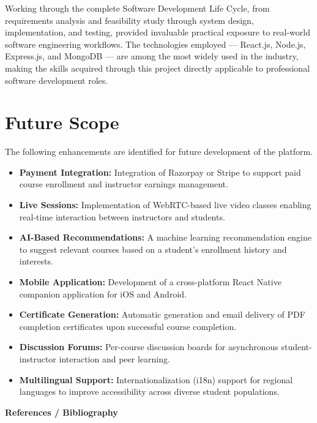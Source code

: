 \documentclass[12pt, a4paper, oneside]{report}
\begin{document}
Working through the complete Software Development Life Cycle, from requirements analysis and feasibility study through system design, implementation, and testing, provided invaluable practical exposure to real-world software engineering workflows. The technologies employed --- React.js, Node.js, Express.js, and MongoDB --- are among the most widely used in the industry, making the skills acquired through this project directly applicable to professional software development roles.

\section*{Future Scope}

The following enhancements are identified for future development of the platform.

\begin{itemize}[leftmargin=1.5cm, itemsep=2pt]
  \item \textbf{Payment Integration:} Integration of Razorpay or Stripe to support paid course enrollment and instructor earnings management.
  \item \textbf{Live Sessions:} Implementation of WebRTC-based live video classes enabling real-time interaction between instructors and students.
  \item \textbf{AI-Based Recommendations:} A machine learning recommendation engine to suggest relevant courses based on a student's enrollment history and interests.
  \item \textbf{Mobile Application:} Development of a cross-platform React Native companion application for iOS and Android.
  \item \textbf{Certificate Generation:} Automatic generation and email delivery of PDF completion certificates upon successful course completion.
  \item \textbf{Discussion Forums:} Per-course discussion boards for asynchronous student-instructor interaction and peer learning.
  \item \textbf{Multilingual Support:} Internationalization (i18n) support for regional languages to improve accessibility across diverse student populations.
\end{itemize}

\newpage
{}
\begin{center}
{\fontsize{16}{19}\selectfont\bfseries References / Bibliography}
\end{center}
\vspace{0.5cm}
\end{document}
